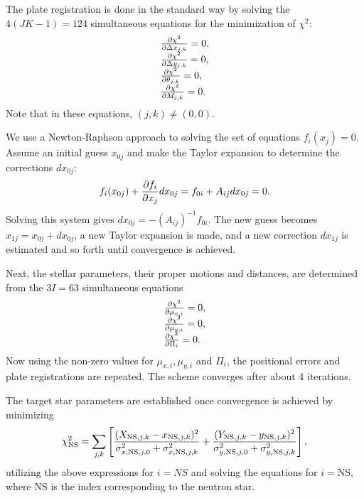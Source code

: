 \documentclass[12pt,preprint]{aastex}
\begin{document}
The plate registration is done in the standard way by solving the
$4(JK-1)=124$ simultaneous equations for the minimization of $\chi^2$:
\begin{equation}
\begin{array}{llll}
{\partial\chi^2\over\partial\Delta x_{j,k}}=0,\\
{\partial\chi^2\over\partial\Delta y_{j,k}}=0,\\
{\partial\chi^2\over\partial\theta_{j,k}}=0,\\
{\partial\chi^2\over\partial M_{j,k}}=0.
\end{array}
\end{equation}
Note that in these equations, $(j,k)\ne(0,0)$.  

We use a Newton-Raphson 
approach to solving the set of equations $f_i(x_j)=0$.  
Assume an initial guess $x_{0j}$ and make the Taylor expansion to
determine the corrections $dx_{0j}$:
\begin{equation}
f_i(x_{0j})+{\partial f_i\over \partial x_j}dx_{0j}=f_{0i}+A_{ij}dx_{0j}=0.
\end{equation}
Solving this system gives
$dx_{0j}=-(A_{ij})^{-1}f_{0i}.$ The new guess becomes
$x_{1j}=x_{0j}+dx_{0j}$, a new Taylor expansion is made, and a new
correction $dx_{1j}$ is estimated and so forth until convergence is
achieved.

Next, the stellar parameters, their proper motions and distances, are determined
from the $3I=63$ simultaneous equations
\begin{equation}
\begin{array}{lll}
{\partial\chi^2\over\partial \mu_{x,i}}=0,\\
{\partial\chi^2\over\partial \mu_{y,i}}=0,\\
{\partial\chi^2\over\partial \Pi_{i}}=0.
\end{array}
\end{equation}
 Now using the non-zero
values for $\mu_{x,i}, \mu_{y,i}$ and $\Pi_i$, the positional errors and
plate registrations are repeated.  The scheme converges after about 4
iterations.

The target star parameters are established once convergence is
achieved by minimizing
\begin{equation}
\chi^2_{\rm NS}=\sum_{j,k}\left[{(X_{{\rm NS},j,k}-x_{{\rm NS},j,k})^2
\over\sigma_{x,{\rm NS},j,0}^2+\sigma_{x,{\rm NS},j,k}^2} +
{(Y_{{\rm NS},j,k}-y_{{\rm NS},j,k})^2
\over\sigma_{y,{\rm NS},j,0}^2+\sigma_{y,{\rm NS},j,k}^2}\right],\end{equation}
utilizing the above expressions for $i=NS$ and solving the equations
for $i=$NS, where NS is the index corresponding to the neutron star.  
\end{document}
